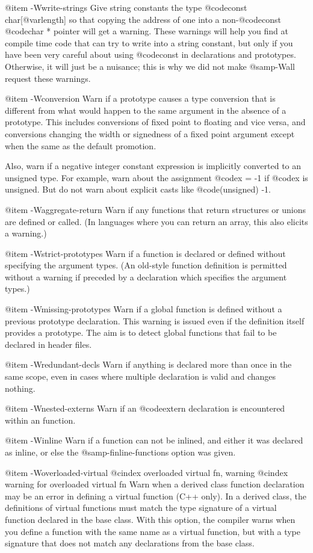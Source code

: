{@item -Wwrite-strings
Give string constants the type @code{const char[@var{length}]} so that
copying the address of one into a non-@code{const} @code{char *}
pointer will get a warning.  These warnings will help you find at
compile time code that can try to write into a string constant, but
only if you have been very careful about using @code{const} in
declarations and prototypes.  Otherwise, it will just be a nuisance;
this is why we did not make @samp{-Wall} request these warnings.

@item -Wconversion
Warn if a prototype causes a type conversion that is different from what
would happen to the same argument in the absence of a prototype.  This
includes conversions of fixed point to floating and vice versa, and
conversions changing the width or signedness of a fixed point argument
except when the same as the default promotion.

Also, warn if a negative integer constant expression is implicitly
converted to an unsigned type.  For example, warn about the assignment
@code{x = -1} if @code{x} is unsigned.  But do not warn about explicit
casts like @code{(unsigned) -1}.

@item -Waggregate-return
Warn if any functions that return structures or unions are defined or
called.  (In languages where you can return an array, this also elicits
a warning.)

@item -Wstrict-prototypes
Warn if a function is declared or defined without specifying the
argument types.  (An old-style function definition is permitted without
a warning if preceded by a declaration which specifies the argument
types.)

@item -Wmissing-prototypes
Warn if a global function is defined without a previous prototype
declaration.  This warning is issued even if the definition itself
provides a prototype.  The aim is to detect global functions that fail
to be declared in header files.

@item -Wredundant-decls
Warn if anything is declared more than once in the same scope, even in
cases where multiple declaration is valid and changes nothing.

@item -Wnested-externs
Warn if an @code{extern} declaration is encountered within an function.

@item -Winline
Warn if a function can not be inlined, and either it was declared as inline,
or else the @samp{-finline-functions} option was given.

@item -Woverloaded-virtual
@cindex overloaded virtual fn, warning
@cindex warning for overloaded virtual fn
Warn when a derived class function declaration may be an error in
defining a virtual function (C++ only).  In a derived class, the
definitions of virtual functions must match the type signature of a
virtual function declared in the base class.  With this option, the
compiler warns when you define a function with the same name as a
virtual function, but with a type signature that does not match any
declarations from the base class.

}
